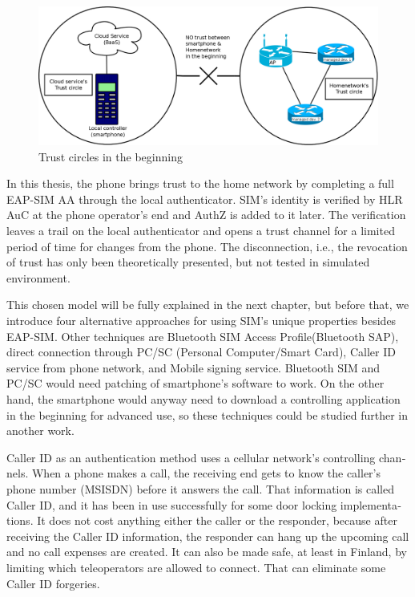 \documentclass[12pt,a4paper,english]{tutthesis}
\begin{document}
\begin{otherlanguage}{english}
\begin{figure}[htb]
\centering
\includegraphics[width=.9\linewidth]{trustcircles.png}
\caption{\label{fig:trustbegin}Trust circles in the beginning}
\end{figure}


In this thesis, the phone brings trust to the home network by
completing a full EAP-SIM AA through the local authenticator. SIM's
identity is verified by HLR AuC at the phone operator's end and AuthZ
is added to it later. The verification leaves a trail on the local
authenticator and opens a trust channel for a limited period of time
for changes from the phone.  The disconnection, i.e., the revocation
of trust has only been theoretically presented, but not tested in
simulated environment.


This chosen model will be fully explained in the next chapter,
but before that, we introduce four 
alternative approaches for using  SIM's unique properties besides EAP-SIM. 
Other techniques  are  Bluetooth SIM Access Profile(Bluetooth  SAP), 
direct connection through PC/SC (Personal\- Computer/Smart\- Card),
Caller ID service from phone network, and Mobile signing service.
Bluetooth SIM and PC/SC would need patching of smartphone's software
to work.  On the other hand, the smartphone would anyway need to
download  a controlling application
in the beginning for advanced use, so these techniques could be
studied further in another work.

Caller ID as an authentication method uses a cellular network's controlling
channels. When a phone makes a call, the receiving end gets 
to know the caller's phone number (MSISDN) before it answers the call.
That information is called Caller ID, and it has been in use
successfully for some door locking implementations. 
It does not cost anything either the caller or the responder,
because after receiving the Caller ID  information, the responder can hang
up the upcoming call and no call expenses are created.
 It can also be made safe, at least in Finland,
by limiting which teleoperators are allowed to connect. That
can eliminate some Caller ID forgeries.















\end{otherlanguage}
\end{document}
